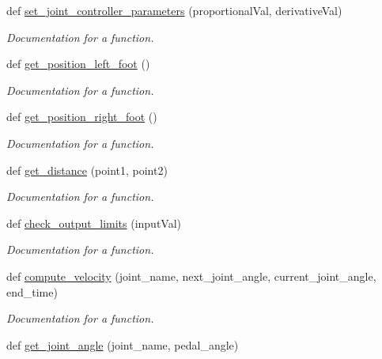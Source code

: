 \begin{DoxyCompactItemize}
def \mbox{\hyperlink{namespacepedal__simulation__interpolation__lennard_a9df1fa4c58719674f8b9b9b8ba918f7f}{set\+\_\+joint\+\_\+controller\+\_\+parameters}} (proportional\+Val, derivative\+Val)
\begin{DoxyCompactList}\small\item\em Documentation for a function. \end{DoxyCompactList}\item 
def \mbox{\hyperlink{namespacepedal__simulation__interpolation__lennard_a156ed568100a761e44b48e4925b496ae}{get\+\_\+position\+\_\+left\+\_\+foot}} ()
\begin{DoxyCompactList}\small\item\em Documentation for a function. \end{DoxyCompactList}\item 
def \mbox{\hyperlink{namespacepedal__simulation__interpolation__lennard_ae122a0520bf1276f3c17d952ecc326e7}{get\+\_\+position\+\_\+right\+\_\+foot}} ()
\begin{DoxyCompactList}\small\item\em Documentation for a function. \end{DoxyCompactList}\item 
def \mbox{\hyperlink{namespacepedal__simulation__interpolation__lennard_a5344f8d2cb5cfc7eb12ef8bd1c1ae9a4}{get\+\_\+distance}} (point1, point2)
\begin{DoxyCompactList}\small\item\em Documentation for a function. \end{DoxyCompactList}\item 
def \mbox{\hyperlink{namespacepedal__simulation__interpolation__lennard_ac79192f087723dc357712fc70a17d113}{check\+\_\+output\+\_\+limits}} (input\+Val)
\begin{DoxyCompactList}\small\item\em Documentation for a function. \end{DoxyCompactList}\item 
def \mbox{\hyperlink{namespacepedal__simulation__interpolation__lennard_ad86b44a97e31f2c448d832f4f74c06ca}{compute\+\_\+velocity}} (joint\+\_\+name, next\+\_\+joint\+\_\+angle, current\+\_\+joint\+\_\+angle, end\+\_\+time)
\begin{DoxyCompactList}\small\item\em Documentation for a function. \end{DoxyCompactList}\item 
def \mbox{\hyperlink{namespacepedal__simulation__interpolation__lennard_ac3638bcbd02798c389a8a54186f250f9}{get\+\_\+joint\+\_\+angle}} (joint\+\_\+name, pedal\+\_\+angle)

\end{DoxyCompactItemize}
